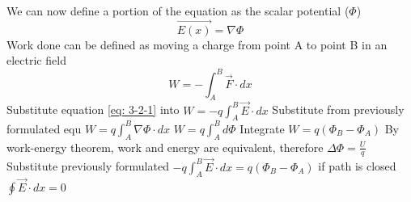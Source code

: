 \documentclass[12pt]{article}
\begin{document}
    We can now define a portion of the equation as the scalar potential ($\Phi$)
    \begin{equation} \label{eq: 3-4-7}
        \vec{E(x)}= \nabla \Phi
    \end{equation}
    Work done can be defined as moving a charge from point A to point B in an electric field
    \begin{equation} \label{eq: 3-4-8}
        W = - \int_A^B \vec{F} \cdot dx
    \end{equation}
\newline Substitute equation \ref{eq: 3-2-1} into 
\newline $W = -q \int_A^B \vec{E} \cdot dx $
\newline Substitute from previously formulated equ
\newline $W = q \int_A^B \nabla \Phi \cdot dx$
\newline $W = q \int_A^B d\Phi$
\newline Integrate
\newline $W = q (\Phi_B - \Phi_A)$
\newline By work-energy theorem, work and energy are equivalent, therefore
\newline $\Delta \Phi = \frac{U}{q}$
\newline Substitute previously formulated
\newline $-q\int_A^B \vec{E} \cdot dx = q (\Phi_B - \Phi_A)$
\newline if path is closed
\newline $\oint \vec{E} \cdot dx = 0$
\end{document}
